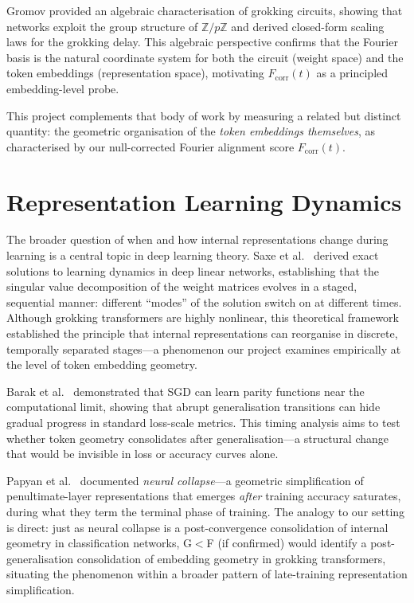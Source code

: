 \documentclass[12pt,openany,a4paper]{book}
\newcommand{\fcorr}{F_{\mathrm{corr}}}
\begin{document}
Gromov \cite{gromov2023grokking} provided an algebraic characterisation
of grokking circuits, showing that networks exploit the group structure
of $\mathbb{Z}/p\mathbb{Z}$ and derived closed-form scaling laws for
the grokking delay.
This algebraic perspective confirms that the Fourier basis is the
natural coordinate system for both the circuit (weight space) and
the token embeddings (representation space), motivating $\fcorr(t)$
as a principled embedding-level probe.

This project complements that body of work by measuring a
related but distinct quantity: the geometric organisation of the
\emph{token embeddings themselves}, as characterised by our
null-corrected Fourier alignment score $\fcorr(t)$.

\section{Representation Learning Dynamics}

The broader question of when and how internal representations change
during learning is a central topic in deep learning theory.
Saxe et al.\ \cite{saxe2014exact} derived exact solutions to learning
dynamics in deep linear networks, establishing that the singular
value decomposition of the weight matrices evolves in a staged,
sequential manner: different ``modes'' of the solution switch on at
different times.
Although grokking transformers are highly nonlinear, this theoretical
framework established the principle that internal representations
can reorganise in discrete, temporally separated stages---a
phenomenon our project examines empirically at the level of token
embedding geometry.

Barak et al.\ \cite{barak2022hidden} demonstrated that SGD can learn
parity functions near the computational limit, showing that abrupt
generalisation transitions can hide gradual progress in standard
loss-scale metrics.
This timing analysis aims to test whether token geometry consolidates
after generalisation---a structural change that would be invisible
in loss or accuracy curves alone.

Papyan et al.\ \cite{papyan2020prevalence} documented \emph{neural
collapse}---a geometric simplification of penultimate-layer
representations that emerges \emph{after} training accuracy saturates,
during what they term the terminal phase of training.
The analogy to our setting is direct: just as neural collapse is a
post-convergence consolidation of internal geometry in classification
networks, G$<$F (if confirmed) would identify a post-generalisation
consolidation of embedding geometry in grokking transformers,
situating the phenomenon within a broader pattern of late-training
representation simplification.
\end{document}
